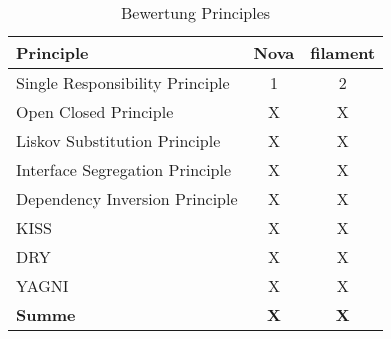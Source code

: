 \begin{table}[]
    \label{tab:bewertung-principles}
    \centering
    \begin{tabular}{|l|c|c|}
        \hline
        \textbf{Principle}              & \textbf{Nova} & \textbf{filament} \\ \hline
        Single Responsibility Principle & 1             & 2                 \\ \hline
        Open Closed Principle           & X             & X                 \\ \hline
        Liskov Substitution Principle   & X             & X                 \\ \hline
        Interface Segregation Principle & X             & X                 \\ \hline
        Dependency Inversion Principle  & X             & X                 \\ \hline
        KISS                            & X             & X                 \\ \hline
        DRY                             & X             & X                 \\ \hline
        YAGNI                           & X             & X                 \\ \hline
        \textbf{Summe}                  & \textbf{X}    & \textbf{X}        \\ \hline
    \end{tabular}
    \caption{Bewertung Principles}
\end{table}

\color{black}
